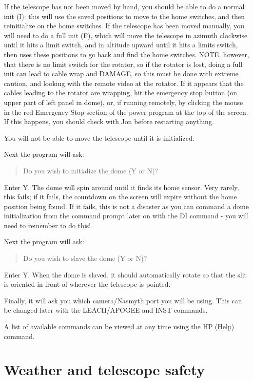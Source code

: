\documentclass[10pt]{report}
\begin{document}
If the telescope has not been moved by hand, you should be able to do a normal
init (I): this will use the saved positions to move to the home switches, and
then reinitialize on the home switches. If the telescope has been moved
manually, you will need to do a full init (F), which will move the telescope
in azimuth clockwise until it hits a limit switch, and in altitude upward 
until it hits a limits switch, then uses these positions to go back and
find the home switches. NOTE, however, that there is no limit switch for the
rotator, so if the rotator is lost, doing a full init can lead to cable wrap
and DAMAGE, so this must be done with extreme caution, and looking with the
remote video at the rotator.
If it appears that the cables leading to the rotator are wrapping, 
hit the emergency stop button (on upper part of left panel in dome), or,
if running remotely, by clicking the mouse in the red Emergency Stop section 
of the power program at the top of the screen. If this happens, you should
check with Jon before restarting anything.

You will not be able to move the telescope until it is initialized.

Next the program will ask:

\begin{quote}
Do you wish to initialize the dome (Y or N)?
\end{quote}

Enter Y. The dome will spin around until it finds its home sensor. Very
rarely, this fails; if it fails, the countdown on the screen will expire
without the home position being found. If it fails, this is not a disaster 
as you can command a dome initialization from the command prompt later on
with the DI command - you will need to remember to do this!

Next the program will ask:

\begin{quote}
Do you wish to slave the dome (Y or N)?
\end{quote}

Enter Y. When the dome is slaved, it should automatically rotate so that
the slit is oriented in front of wherever the telescope is pointed.

Finally, it will ask you which camera/Nasmyth port you will be using.
This can be changed later with the LEACH/APOGEE and INST commands.

A list of available commands can be viewed at any
time using the HP (Help) command.

\section{Weather and telescope safety}
\end{document}
